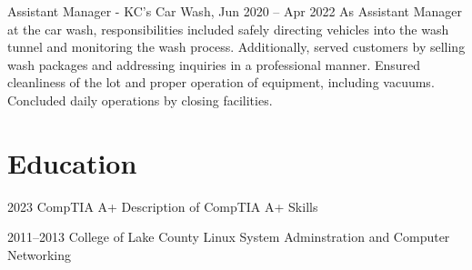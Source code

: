 \documentclass{simplecv}
\begin{document}
\begin{topic}
\item[Assistant Manager - KC's Car Wash, Jun 2020 -- Apr 2022]
As Assistant Manager at the car wash, responsibilities included safely directing vehicles into the wash tunnel and monitoring the wash process. Additionally, served customers by selling wash packages and addressing inquiries in a professional manner. Ensured cleanliness of the lot and proper operation of equipment, including vacuums. Concluded daily operations by closing facilities.
\end{topic}

\section{Education}

\begin{topic}
\item[2023 CompTIA A+]
Description of CompTIA A+ Skills

\item[2011--2013 College of Lake County]
Linux System Adminstration and Computer Networking
\end{topic}
\end{document}
